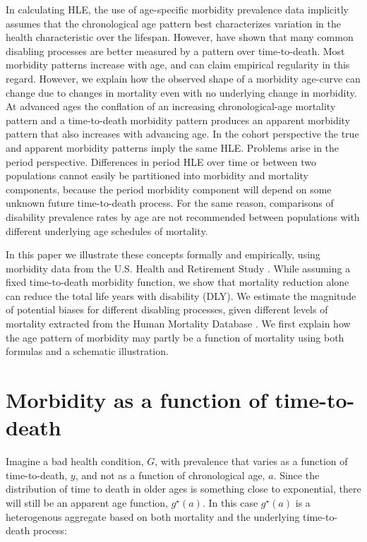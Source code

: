\documentclass[11pt,oneside,a4paper]{article} %
\begin{document}
In calculating HLE, the use of age-specific morbidity prevalence data implicitly
assumes that the chronological age pattern best characterizes variation in the
health characteristic over the lifespan.
However, \citet{riffe2015ttd} have shown that many common disabling
processes are better measured by a pattern over time-to-death. Most morbidity
patterns increase with age, and can claim empirical regularity in this regard.
However, we explain how the observed shape of a morbidity age-curve can change
due to changes in mortality even with no underlying change in morbidity. At advanced ages the conflation of an increasing chronological-age
mortality pattern and a time-to-death morbidity pattern produces an apparent morbidity pattern that also increases with advancing age. In the
cohort perspective the true and apparent morbidity patterns imply the same HLE.
Problems arise in the period perspective. Differences in period HLE over
time or between two populations cannot easily be partitioned into morbidity and
mortality components, because the period morbidity component will depend on some unknown future time-to-death process. For the same reason, comparisons of disability prevalence rates by age are not recommended between populations with different underlying age schedules of mortality.

In this paper we illustrate these concepts formally and empirically, using
morbidity data from the U.S. Health and Retirement Study \citep{HRS}. While
assuming a fixed time-to-death morbidity function, we show that mortality
reduction alone can reduce the total life years with disability (DLY). We
estimate the magnitude of potential biases for different disabling processes,
given different levels of mortality extracted from the Human Mortality Database
\citep{HMD2015}. We first explain how the age pattern of morbidity may partly be
a function of mortality using both formulas and a schematic illustration.


\section{Morbidity as a function of time-to-death}
 
Imagine a bad health condition, $G$, with prevalence that varies as a
function of time-to-death, $y$, and not as a function of chronological age, $a$.
Since the distribution of time to death in older ages is something
close to exponential, there will still be an apparent age function,
$g^\star(a)$.
In this case $g^\star(a)$ is a heterogenous aggregate based on both mortality
and the underlying time-to-death process:
 
\end{document}

